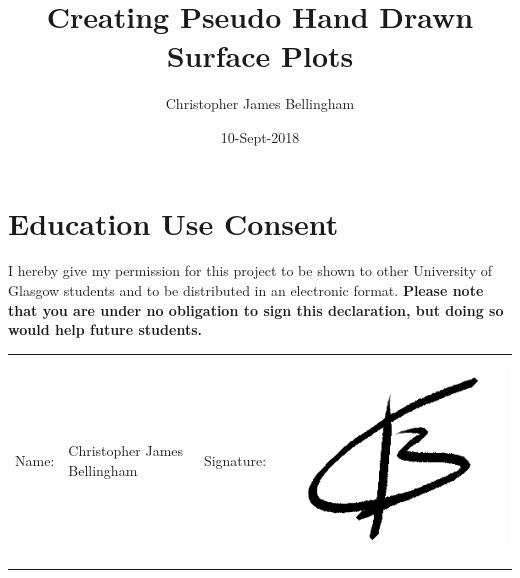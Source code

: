 \documentclass{mproj}
\makeatletter
\newcommand{\educationalconsent}{
\newpage
\section*{Education Use Consent}

I hereby give my permission for this project to be shown to other
University of Glasgow students and to be distributed in an electronic
format.  \textbf{Please note that you are under no obligation to sign 
this declaration, but doing so would help future students.}

\begin{tabular}{@{}llll}
      &                     &            &                     \\
      &                     &            &                     \\
Name: & Christopher James Bellingham & Signature: & \includegraphics[scale=0.05]{images/sig} \\
      &                     &            &                     \\
      &                     &            &                     \\
\end{tabular}
}
\makeatother
\begin{document}
\title{Creating Pseudo Hand Drawn Surface Plots}
\author{Christopher James Bellingham}
\date{10-Sept-2018}
\maketitle

% 

\educationalconsent

\newpage


\tableofcontents







\appendix











\end{document}
